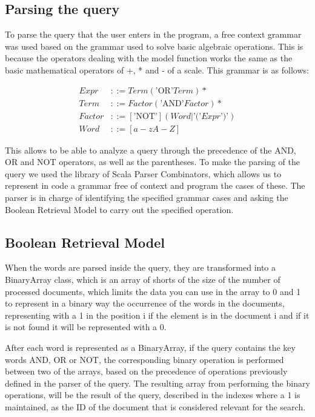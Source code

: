 \documentclass{article}
\begin{document}
\subsection{Parsing the query}

To parse the query that the user enters in the program, a free context grammar was used based on the grammar used to solve basic algebraic operations. This is because the operators dealing with the model function works the same as the basic mathematical operators of +, * and - of a scale. This grammar is as follows:

\begin{align*}
	Expr   & ::= Term (\text{'OR'} Term)*                           \\
	Term   & ::= Factor (\text{'AND'} Factor)*                      \\
	Factor & ::= [\text{'NOT'}] (Word | \text{'('} Expr \text{')'}) \\
	Word   & ::= [a-zA-Z]
\end{align*}

This allows to be able to analyze a query through the precedence of the AND, OR and NOT operators, as well as the parentheses. To make the parsing of the query we used the library of Scala Parser Combinators, which allows us to represent in code a grammar free of context and program the cases of these. The parser is in charge of identifying the specified grammar cases and asking the Boolean Retrieval Model to carry out the specified operation. 

\subsection{Boolean Retrieval Model}

When the words are parsed inside the query, they are transformed into a BinaryArray class, which is an array of shorts of the size of the number of processed documents, which limits the data you can use in the array to 0 and 1 to represent in a binary way the occurrence of the words in the documents, representing with a 1 in the position i if the element is in the document i and if it is not found it will be represented with a 0. 

After each word is represented as a BinaryArray, if the query contains the key words AND, OR or NOT, the corresponding binary operation is performed between two of the arrays, based on the precedence of operations previously defined in the parser of the query. The resulting array from performing the binary operations, will be the result of the query, described in the indexes where a 1 is maintained, as the ID of the document that is considered relevant for the search. 
\end{document}
